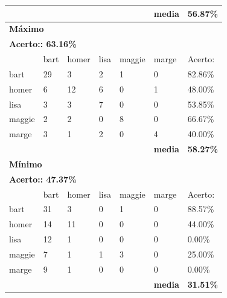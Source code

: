 \documentclass[journal]{IEEEtran}
\begin{document}
\begin{table}[!htb]
\begin{tabular}{l|l|l|l|l|l|l}
\textbf{} & \textbf{} & \textbf{} & \textbf{} & \textbf{} & \textbf{media} & \textbf{56.87\%} \\ \hline
\multicolumn{7}{l}{\textbf{Máximo}}                                                            \\ \hline
\multicolumn{7}{l}{\textbf{Acerto:: 63.16\%}}                                                 \\ \hline
          & bart      & homer     & lisa      & maggie    & marge          & Acerto:            \\ \hline
bart      & 29        & 3         & 2         & 1         & 0              & 82.86\%          \\ \hline
homer     & 6         & 12        & 6         & 0         & 1              & 48.00\%          \\ \hline
lisa      & 3         & 3         & 7         & 0         & 0              & 53.85\%          \\ \hline
maggie    & 2         & 2         & 0         & 8         & 0              & 66.67\%          \\ \hline
marge     & 3         & 1         & 2         & 0         & 4              & 40.00\%          \\ \hline
\textbf{} & \textbf{} & \textbf{} & \textbf{} & \textbf{} & \textbf{media} & \textbf{58.27\%} \\ \hline
\multicolumn{7}{l}{\textbf{Mínimo}}                                                            \\ \hline
\multicolumn{7}{l}{\textbf{Acerto:: 47.37\%}}                                                 \\ \hline
          & bart      & homer     & lisa      & maggie    & marge          & Acerto:            \\ \hline
bart      & 31        & 3         & 0         & 1         & 0              & 88.57\%          \\ \hline
homer     & 14        & 11        & 0         & 0         & 0              & 44.00\%          \\ \hline
lisa      & 12        & 1         & 0         & 0         & 0              & 0.00\%           \\ \hline
maggie    & 7         & 1         & 1         & 3         & 0              & 25.00\%          \\ \hline
marge     & 9         & 1         & 0         & 0         & 0              & 0.00\%           \\ \hline
\textbf{} & \textbf{} & \textbf{} & \textbf{} & \textbf{} & \textbf{media} & \textbf{31.51\%} \\ \hline

\end{tabular}
\end{table}
\end{document}
